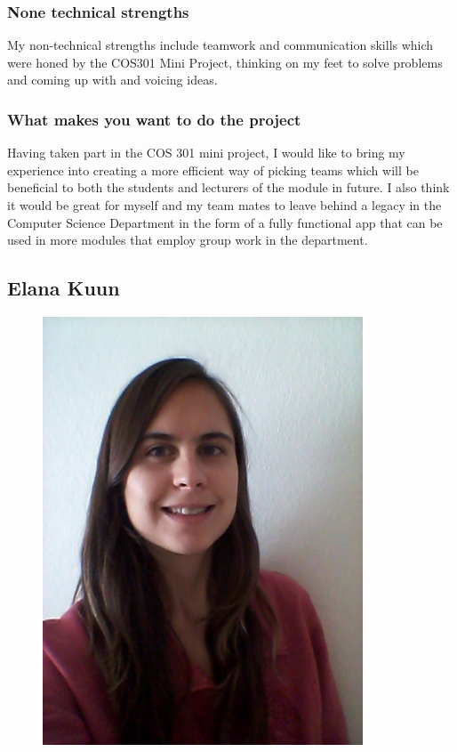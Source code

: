 \documentclass[hidelinks, 12pt, oneside]{article}
\begin{document}
\subsubsection{None technical strengths}
My non-technical strengths include teamwork and communication skills which were honed by the COS301 Mini Project, thinking on my feet to solve problems and coming up with and voicing ideas.
\subsubsection{What makes you want to do the project}
Having taken part in the COS 301 mini project, I would like to bring my experience into creating a more efficient way of picking teams which will be beneficial to both the students and lecturers of the module in future. I also think it would be great for myself and my team mates to leave behind a legacy in the Computer Science Department in the form of a fully functional app that can be used in more modules that employ group work in the department.

\subsection{Elana Kuun}
\begin{figure}[ht!]
  \centering
    \includegraphics[width=0.85\textwidth]{lana} 
\end{figure}
\end{document}
